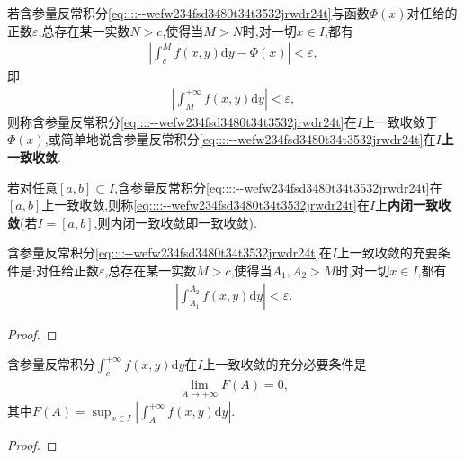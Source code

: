 \documentclass[../../main.tex]{subfiles}
\begin{document}
\begin{definition}
若含参量反常积分\eqref{eq::::--wefw234fsd3480t34t3532jrwdr24t}与函数$\varPhi(x)$对任给的正数$\varepsilon$,总存在某一实数$N>c$,使得当$M>N$时,对一切$x\in I$,都有
\begin{align*}
\left| \int_{c}^{M}f(x,y)\mathrm{d}y - \varPhi(x) \right| < \varepsilon,
\end{align*}
即
\begin{align*}
\left| \int_{M}^{+\infty}f(x,y)\mathrm{d}y \right| < \varepsilon,
\end{align*}
则称含参量反常积分\eqref{eq::::--wefw234fsd3480t34t3532jrwdr24t}在$I$上一致收敛于$\varPhi(x)$,或简单地说含参量反常积分\eqref{eq::::--wefw234fsd3480t34t3532jrwdr24t}在$I$\textbf{上一致收敛}.

若对任意$[a,b]\subset I$,含参量反常积分\eqref{eq::::--wefw234fsd3480t34t3532jrwdr24t}在$[a,b]$上一致收敛,则称\eqref{eq::::--wefw234fsd3480t34t3532jrwdr24t}在$I$上\textbf{内闭一致收敛}(若$I=[a,b]$,则内闭一致收敛即一致收敛).
\end{definition}

\begin{theorem}[一致收敛的柯西准则]
含参量反常积分\eqref{eq::::--wefw234fsd3480t34t3532jrwdr24t}在$I$上一致收敛的充要条件是:对任给正数$\varepsilon$,总存在某一实数$M>c$,使得当$A_1,A_2>M$时,对一切$x\in I$,都有
\begin{align*}
\left| \int_{A_1}^{A_2}f(x,y)\mathrm{d}y \right| < \varepsilon. 
\end{align*}

\end{theorem}
\begin{proof}


\end{proof}

\begin{theorem}
含参量反常积分$\int_{c}^{+\infty}f(x,y)\mathrm{d}y$在$I$上一致收敛的充分必要条件是
\begin{align*}
\lim_{A \to +\infty}F(A)=0,
\end{align*}
其中$F(A)=\sup_{x\in I}\left| \int_{A}^{+\infty}f(x,y)\mathrm{d}y \right|$.
\end{theorem}
\begin{proof}


\end{proof}
\end{document}
